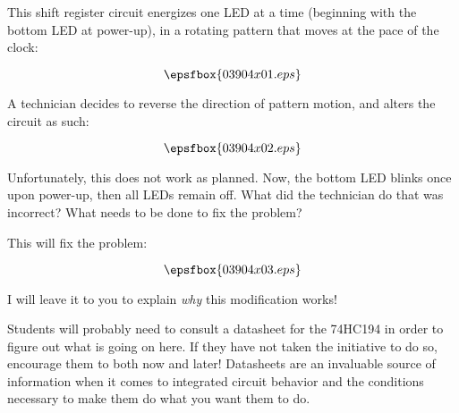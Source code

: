 

This shift register circuit energizes one LED at a time (beginning with the bottom LED at power-up), in a rotating pattern that moves at the pace of the clock:

$$\epsfbox{03904x01.eps}$$

A technician decides to reverse the direction of pattern motion, and alters the circuit as such:

$$\epsfbox{03904x02.eps}$$

Unfortunately, this does not work as planned.  Now, the bottom LED blinks once upon power-up, then all LEDs remain off.  What did the technician do that was incorrect?  What needs to be done to fix the problem?







This will fix the problem:

$$\epsfbox{03904x03.eps}$$

I will leave it to you to explain {\it why} this modification works!







Students will probably need to consult a datasheet for the 74HC194 in order to figure out what is going on here.  If they have not taken the initiative to do so, encourage them to both now and later!  Datasheets are an invaluable source of information when it comes to integrated circuit behavior and the conditions necessary to make them do what you want them to do.




